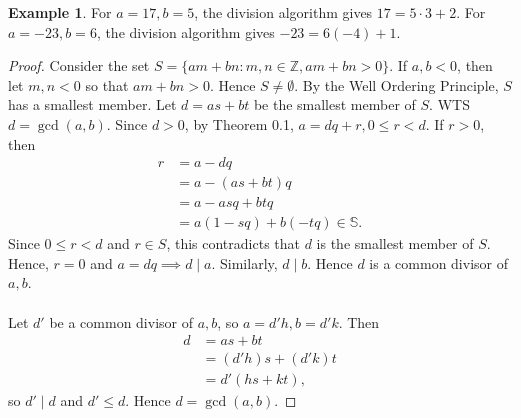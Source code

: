 \documentclass{article}
\newtheorem{theorem}{Theorem}[section]
\theoremstyle{definition}
\newtheorem{definition}{Definition}[section]
\newtheorem{example}{Example}[section]
\begin{document}
\begin{example}
For $a=17,b=5$, the division algorithm gives $17 = 5\cdot3+2$. For $a=-23,b=6$, the division algorithm gives $-23=6(-4)+1$.
\end{example}

\noindent{}

\noindent{}

\begin{proof}
    Consider the set $S=\{am+bn:m,n \in \mathbb{Z},am + bn > 0\}$. If $a, b < 0$, then let $m, n < 0$ so that $am + bn > 0$. Hence $S \neq \emptyset$. By the Well Ordering Principle, $S$ has a smallest member. Let $d=as+bt$ be the smallest member of $S$. WTS $d=\gcd(a,b)$. Since $d>0$, by Theorem 0.1, $a=dq+r,0 \leq r<d$. If $r>0$, then
    \begin{align*}
        r &= a-dq \\
        &= a-(as+bt)q \\
        &= a-asq+btq \\
        &= a(1-sq)+b(-tq) \in \mathbb{S}.
    \end{align*}
    Since $0 \leq r<d$ and $r \in S$, this contradicts that $d$ is the smallest member of $S$. Hence, $r=0$ and $a=dq \implies d \mid a$. Similarly, $d \mid b$. Hence $d$ is a common divisor of $a,b$.
    \\ \\
    Let $d'$ be a common divisor of $a,b$, so $a=d'h,b=d'k$. Then
    \begin{align*}
        d &= as+bt \\
        &= (d'h)s+(d'k)t \\
        &= d'(hs+kt),
    \end{align*}
    so $d' \mid d$ and $d' \leq d$. Hence $d = \gcd(a,b)$.
\end{proof}
\end{document}
